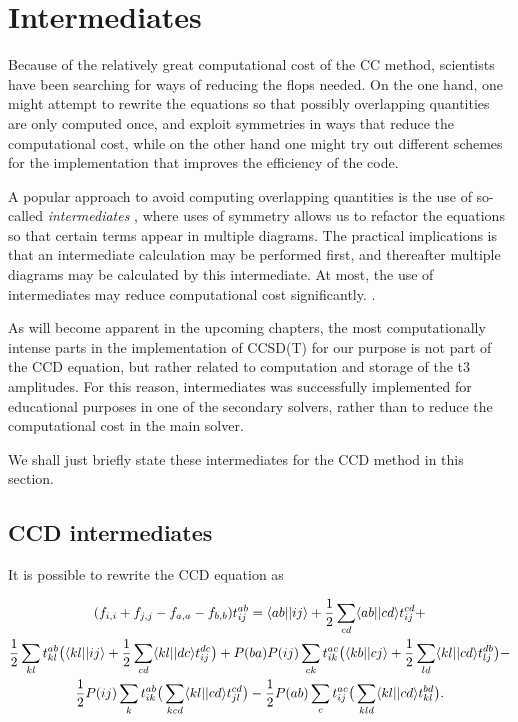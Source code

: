 \section{Intermediates}

Because of the relatively great computational cost of the CC method, scientists have been searching for ways of reducing the flops needed. On the one hand, one might attempt to rewrite the equations so that possibly overlapping quantities are only computed once, and exploit symmetries in ways that reduce the computational cost, while on the other hand one might try out different schemes for the implementation that improves the efficiency of the code.

A popular approach to avoid computing overlapping quantities is the use of so-called \emph{intermediates} \cite{CrawfordSchaefer}, where uses of symmetry allows us to refactor the equations so that certain terms appear in multiple diagrams. The practical implications is that an intermediate calculation may be performed first, and thereafter multiple diagrams may be calculated by this intermediate. At most, the use of intermediates may reduce computational cost significantly. \cite{Baardsen2014}.

As will become apparent in the upcoming chapters, the most computationally intense parts in the implementation of CCSD(T) for our purpose is not part of the CCD equation, but rather related to computation and storage of the t3 amplitudes. For this reason, intermediates was successfully implemented for educational purposes in one of the secondary solvers, rather than to reduce the computational cost in the main solver.

We shall just briefly state these intermediates for the CCD method in this section.

\subsection{CCD intermediates}

It is possible to rewrite the CCD equation as \cite{Baardsen2014}

\begin{multline}
(f_{i,i} + f_{j,j} - f_{a,a} - f_{b,b})t^{ab}_{ij} =\langle ab \vert \vert ij \rangle + 
\frac{1}{2} \sum_{cd} \langle ab \vert \vert cd \rangle t_{ij}^{cd} +\\
\frac{1}{2} \sum_{kl} t^{ab}_{kl} \big{(}  \langle kl \vert \vert ij \rangle   + \frac{1}{2} \sum_{cd}   \langle kl \vert \vert dc \rangle t_{ij}^{dc}  \big{)} +
P(ba)P(ij) \sum_{ck} t_{ik}^{ac} \big{(} \langle kb \vert \vert cj \rangle  + \frac{1}{2} \sum_{ld} \langle kl \vert \vert cd \rangle t_{lj}^{db}\big{)} - \\
\frac{1}{2}P(ij) \sum_k t^{ab}_{ik} \big{(} \sum_{kcd} \langle kl \vert \vert cd \rangle t^{cd}_{jl} \big{)} - 
\frac{1}{2}P(ab) \sum_c t^{ac}_{ij} \big{(} \sum_{kld} \langle kl \vert \vert cd \rangle t^{bd}_{kl} \big{)}.
\end{multline}

